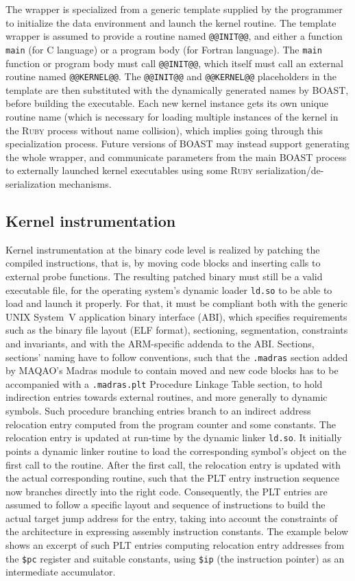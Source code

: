 \documentclass[11pt, a4paper, twoside]{montblanc2}
\def\ruby{\textsc{Ruby}\xspace}
\begin{document}
The wrapper is specialized from a generic template supplied by
the programmer to initialize the data environment and launch the kernel
routine. The template wrapper is assumed to provide a routine named
\verb|@@INIT@@|, and either a function \texttt{main} (for C language) or a
program body (for Fortran language). The \texttt{main} function or program body
must call \verb|@@INIT@@|, which itself must call an external routine named
\verb|@@KERNEL@@|. The \verb|@@INIT@@| and \verb|@@KERNEL@@| placeholders in the 
template are then
substituted with the dynamically generated names by BOAST, before building the
executable. Each new kernel instance gets its own unique routine name (which is 
necessary for loading multiple instances of the kernel in the \ruby process 
without name collision), which implies going through this specialization 
process. Future versions of BOAST may instead support generating the whole 
wrapper, and communicate parameters from the main BOAST process to externally 
launched kernel executables using some \ruby serialization/de-serialization 
mechanisms.

\subsection{Kernel instrumentation}

Kernel instrumentation at the binary code level is realized by patching the 
compiled instructions, that is, by moving code blocks and inserting calls to 
external probe functions. The resulting patched binary must still be a valid 
executable file, for the operating system's dynamic loader \verb|ld.so| to be 
able to load and launch it properly. For that, it must be compliant both with 
the generic UNIX System~V application binary interface (ABI), which specifies 
requirements such as the binary file layout (ELF format), sectioning, 
segmentation, constraints and invariants, and with the ARM-specific addenda to 
the ABI. Sections, sections' naming have to follow conventions, such that the 
\verb|.madras| section added by MAQAO's Madras module to contain moved and new 
code blocks has to be accompanied with a \verb|.madras.plt| Procedure Linkage 
Table section, to hold indirection entries towards external routines, and more generally 
to dynamic symbols. Such procedure branching entries branch to an indirect 
address relocation entry computed from the program counter and some constants. 
The relocation entry is updated at run-time by the dynamic linker \verb|ld.so|. 
It initially points a dynamic linker routine to load the corresponding symbol's 
object on the first call to the routine. After the first call, the relocation 
entry is updated with the actual corresponding routine, such that the PLT entry 
instruction sequence now branches directly into the right code. Consequently, 
the PLT entries
are assumed to follow a specific layout and sequence of instructions to build 
the actual target jump address for the entry, taking into account the 
constraints of the architecture in expressing assembly instruction constants. 
The example below shows an excerpt of such PLT entries computing relocation 
entry addresses from the \verb|$pc| register and suitable constants, using 
\verb|$ip| (the instruction pointer) as an intermediate accumulator.
\end{document}
